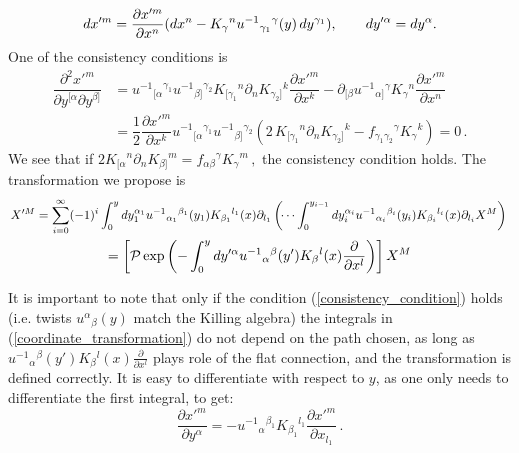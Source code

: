 \documentclass[12pt, utf8]{article}
\newcommand\scalemath[2]{\scalebox{#1}{\mbox{\ensuremath{\displaystyle #2}}}}
\numberwithin{equation}{section}
\begin{document}
\begin{equation}
    dx'^{m} = \dfrac{\partial{x'^{m}}}{\partial x^{n}}(dx^{n} - K_{\gamma}{}^{n} u^{-1}{}_{\gamma_1}{}^{ \gamma}(y) \,dy^{\gamma_1}), \qquad dy'^{\alpha} = dy^{\alpha}.
\end{equation}
One of the consistency conditions is 
\begin{equation} \label{consistency_condition}
    \begin{aligned}
          \dfrac{\partial^2 x'^m}{\partial y^{[\alpha} \partial y^{\beta]}} & = u^{-1}{}_{[\alpha}{}^{\gamma_1} u^{-1}{}_{\beta]}{}^{\gamma_2} K_{[\gamma_1}{}^{n} \partial_{n} K_{\gamma_2 ]}{}^{k} \dfrac{\partial x'^m}{\partial x^k}  - \partial_{[\beta} u^{-1}{}_{\alpha]}{}^{\gamma} K_{\gamma}{}^{n} \dfrac{\partial x'^m}{\partial x^n}  \\
          & = \dfrac{1}{2} \dfrac{\partial x'^m}{\partial x^k} u^{-1}{}_{[\alpha}{}^{\gamma_1} u^{-1}{}_{\beta]}{}^{\gamma_2} ( 2 \, K_{[\gamma_1}{}^{n} \partial_{n} K_{\gamma_2 ]}{}^{k} - f_{\gamma_1 \gamma_2}{}^{\gamma} K_{\gamma}{}^{k}   ) =0\, . 
    \end{aligned}
\end{equation}
We see that if $2 K_{[\alpha}{}^{n} \partial_{n} K_{\beta ]}{}^{m} = f_{\alpha \beta}{}^{\gamma} K_{\gamma}{}^{m} \, ,$
the consistency condition holds. The transformation we propose is 
\begin{multline} \label{coordinate_transformation}
  \scalemath{0.88}{  X'^{M} =  \sum_{i=0}^{\infty}  (-1)^{i} \int_{0}^{y} dy_{1}^{\alpha_1} u^{-1 }{}_{\alpha_1}{}^{\beta_1}(y_1) K_{\beta_1}{}^{l_1}(x) \partial_{l_1} \left(  \dots  \int_{0}^{y_{i-1}} dy_{i}^{\alpha_i} u^{-1 }{}_{\alpha_i}{}^{\beta_i}(y_{i}) K_{\beta_i}{}^{l_i}(x) \partial_{l_i} X^{M} \right)  \, } \\ 
  =  \left[ \mathcal{P} \exp \left( - \int_{0}^{y} dy'^{\alpha} u^{-1}{}_{\alpha}{}^{ \beta}(y') K_{\beta}{}^{l}(x) \frac{\partial}{\partial x^l} \right) \right] X^{M}
\end{multline}



It is important to note that only if the condition (\ref{consistency_condition}) holds (i.e. twists $u^{\alpha}{}_{\beta}(y)$  match the Killing algebra) the integrals in (\ref{coordinate_transformation}) do not depend on the path chosen, as long as $u^{-1}{}_{\alpha}{}^{ \beta}(y') K_{\beta}{}^{l}(x) \frac{\partial}{\partial x^l}$ plays role of the flat connection, and the transformation is defined correctly. It is easy to differentiate with respect to $y$, as one only needs to differentiate the first integral, to get: 
\begin{equation}
    \dfrac{\partial x'^{m}}{\partial y^{\alpha}} = - u^{-1 }{}_{\alpha}{}^{\beta_1} K_{\beta_1}{}^{l_1} \dfrac{\partial x'^{m}}{\partial x_{l_1}} \, .
\end{equation}
\end{document}
